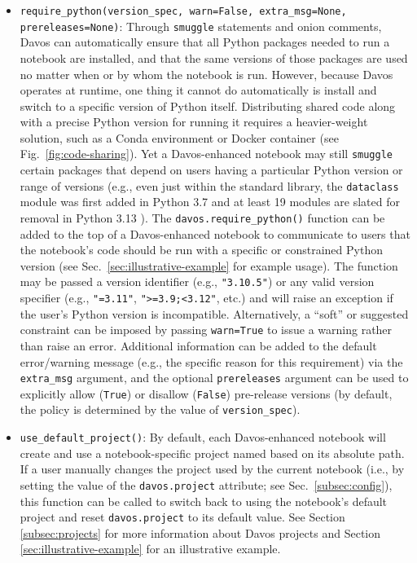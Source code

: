 \documentclass[preprint,12pt,a4paper]{elsarticle}
\begin{document}
\begin{itemize}
\item \texttt{require\_python(version\_spec, warn=False, extra\_msg=None, prereleases=None)}: Through \texttt{smuggle} statements and onion comments, Davos can automatically ensure that all Python packages needed to run a notebook are installed, and that the same versions of those packages are used no matter when or by whom the notebook is run.
  However, because Davos operates at runtime, one thing it cannot do automatically is install and switch to a specific version of Python itself.
  Distributing shared code along with a precise Python version for running it requires a heavier-weight solution, such as a Conda environment or Docker container (see Fig.~\ref{fig:code-sharing}).
  Yet a Davos-enhanced notebook may still \texttt{smuggle} certain packages that depend on users having a particular Python version or range of versions (e.g., even just within the standard library, the \texttt{dataclass} module was first added in Python 3.7 \cite{Smit17} and at least 19 modules are slated for removal in Python 3.13 \cite{HeimCann19}).
  The \texttt{davos.require\_python()} function can be added to the top of a Davos-enhanced notebook to communicate to users that the notebook's code should be run with a specific or constrained Python version (see Sec.~\ref{sec:illustrative-example} for example usage).
  The function may be passed a version identifier (e.g., \texttt{"3.10.5"}) or any valid version specifier \cite{CoghStuf13} (e.g., \texttt{"\raisebox{0.5ex}{\texttildelow}=3.11"}, \texttt{">=3.9;<3.12"}, etc.) and will raise an exception if the user's Python version is incompatible.
  Alternatively, a ``soft'' or suggested constraint can be imposed by passing \texttt{warn=True} to issue a warning rather than raise an error.
  Additional information can be added to the default error/warning message (e.g., the specific reason for this requirement) via the \texttt{extra\_msg} argument, and the optional \texttt{prereleases} argument can be used to explicitly allow (\texttt{True}) or disallow (\texttt{False}) pre-release versions (by default, the policy is determined by the value of \texttt{version\_spec}).

\item \texttt{use\_default\_project()}: By default, each Davos-enhanced notebook will create and use a notebook-specific project named based on its absolute path.
  If a user manually changes the project used by the current notebook (i.e., by setting the value of the \texttt{davos.project} attribute; see Sec.~\ref{subsec:config}), this function can be called to switch back to using the notebook's default project and reset \texttt{davos.project} to its default value.
  See Section \ref{subsec:projects} for more information about Davos projects and Section \ref{sec:illustrative-example} for an illustrative example.

\end{itemize}
\end{document}
